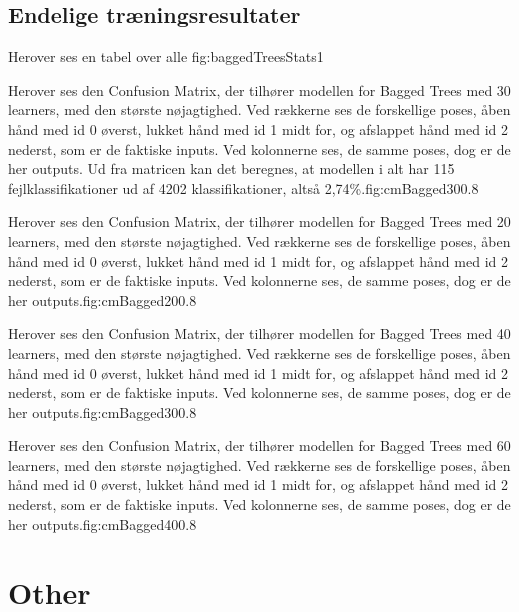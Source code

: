 \section{Endelige træningsresultater}

{Herover ses en tabel over alle }{fig:baggedTreesStats}{1}

{Herover ses den Confusion Matrix, der tilhører modellen for Bagged Trees med 30 learners, med den største nøjagtighed. Ved rækkerne ses de forskellige poses, åben hånd med id 0 øverst, lukket hånd med id 1 midt for, og afslappet hånd med id 2 nederst, som er de faktiske inputs. Ved kolonnerne ses, de samme poses, dog er de her outputs. Ud fra matricen kan det beregnes, at modellen i alt har 115 fejlklassifikationer ud af 4202 klassifikationer, altså 2,74\%.}{fig:cmBagged30}{0.8}

{Herover ses den Confusion Matrix, der tilhører modellen for Bagged Trees med 20 learners, med den største nøjagtighed. Ved rækkerne ses de forskellige poses, åben hånd med id 0 øverst, lukket hånd med id 1 midt for, og afslappet hånd med id 2 nederst, som er de faktiske inputs. Ved kolonnerne ses, de samme poses, dog er de her outputs.}{fig:cmBagged20}{0.8}

{Herover ses den Confusion Matrix, der tilhører modellen for Bagged Trees med 40 learners, med den største nøjagtighed. Ved rækkerne ses de forskellige poses, åben hånd med id 0 øverst, lukket hånd med id 1 midt for, og afslappet hånd med id 2 nederst, som er de faktiske inputs. Ved kolonnerne ses, de samme poses, dog er de her outputs.}{fig:cmBagged30}{0.8}

{Herover ses den Confusion Matrix, der tilhører modellen for Bagged Trees med 60 learners, med den største nøjagtighed. Ved rækkerne ses de forskellige poses, åben hånd med id 0 øverst, lukket hånd med id 1 midt for, og afslappet hånd med id 2 nederst, som er de faktiske inputs. Ved kolonnerne ses, de samme poses, dog er de her outputs.}{fig:cmBagged40}{0.8}

\chapter{Other}
\newpage
\listoftables
\vspace{1cm}
\listoffigures